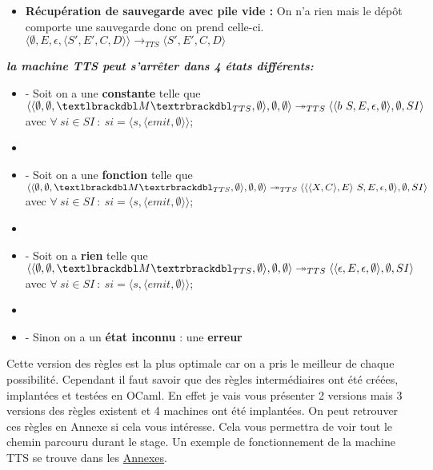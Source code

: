 \documentclass[10pt,a4paper]{report}
\begin{document}
\begin{enumerate}
\begin{itemize}
			\item[] \textbf{Récupération de sauvegarde avec pile vide :}  On n'a rien mais le dépôt comporte une sauvegarde donc on prend celle-ci.
			\smallbreak  
			$\langle \emptyset,E,\epsilon,\langle S',E',C,D\rangle\rangle
			\longrightarrow_{TTS} 
			\langle S',E',C,D\rangle$
		\end{itemize}
	\end{enumerate}
	\bigbreak
	\bigbreak
	
	
	
\textbf{\textit{la machine TTS peut s'arrêter dans 4 états différents:}}
\smallbreak
\begin{itemize}
	\item[] - Soit on a une \textbf{constante} telle que 
	$\langle\langle \emptyset,\emptyset,\textlbrackdbl M\textrbrackdbl_{TTS},\emptyset\rangle,\emptyset,\emptyset\rangle 
	\twoheadrightarrow_{TTS} 
	\langle\langle b~S,E,\epsilon,\emptyset\rangle,\emptyset,SI\rangle$
	\\ avec $\forall~si \in SI~:~si = \langle s,\langle emit,\emptyset\rangle\rangle$;
	\item[] 
	\item[] - Soit on a une \textbf{fonction} telle que
	$\langle\langle \emptyset,\emptyset,\textlbrackdbl M\textrbrackdbl_{TTS},\emptyset\rangle,\emptyset,\emptyset\rangle 
	\twoheadrightarrow_{TTS} 
	\langle\langle\langle X,C\rangle,E\rangle~S,E,\epsilon,\emptyset\rangle,\emptyset,SI\rangle$
	\\ avec $\forall~si \in SI~:~si = \langle s,\langle emit,\emptyset\rangle\rangle$;
	\item[]
	\item[] - Soit on a \textbf{rien} telle que
	$\langle\langle \emptyset,\emptyset,\textlbrackdbl M\textrbrackdbl_{TTS},\emptyset\rangle,\emptyset,\emptyset\rangle 
	\twoheadrightarrow_{TTS} 
	\langle\langle\epsilon,E,\epsilon,\emptyset\rangle,\emptyset,SI\rangle$
	\\ avec $\forall~si \in SI~:~si = \langle s,\langle emit,\emptyset\rangle\rangle$;
	\item[]  
	\item[] - Sinon on a un \textbf{état inconnu} : une \textbf{erreur} 
\end{itemize}
\bigbreak
\bigbreak
	
	
	
	Cette version des règles est la plus optimale car on a pris le meilleur de chaque possibilité. Cependant il faut savoir que des règles intermédiaires ont été créées, implantées et testées en OCaml. En effet je vais vous présenter 2 versions mais 3 versions des règles existent et 4 machines ont été implantées. On peut retrouver ces règles en Annexe si cela vous intéresse. Cela vous permettra de voir tout le chemin parcouru durant le stage. Un exemple de fonctionnement de la machine TTS se trouve dans les \hyperref[TTS]{Annexes}.
	\newpage
	
\end{document}
